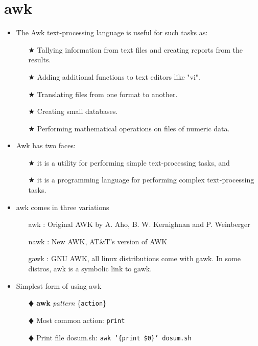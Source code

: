 \documentclass[10pt,t]{beamer}
\begin{document}
\section{awk}
\begin{frame}
  \begin{itemize}
    \item The Awk text-processing language is useful for such tasks as:
    \begin{enumerate}
      \item[$\bigstar$] Tallying information from text files and creating reports from the results.
      \item[$\bigstar$]Adding additional functions to text editors like "vi".
      \item[$\bigstar$] Translating files from one format to another.
      \item[$\bigstar$] Creating small databases.
      \item[$\bigstar$]Performing mathematical operations on files of numeric data.
    \end{enumerate}
    \item Awk has two faces: 
    \begin{enumerate}
      \item[$\bigstar$] it is a utility for performing simple text-processing tasks, and 
      \item[$\bigstar$] it is a programming language for performing complex text-processing tasks.
    \end{enumerate}
    \item awk comes in three variations
    \begin{enumerate}
        \item[awk]: Original AWK by A. Aho, B. W. Kernighnan and P. Weinberger
        \item[nawk]: New AWK, AT\&T's version of AWK
        \item[gawk]: GNU AWK, all linux distributions come with gawk. In some distros, awk is a symbolic link to gawk.
    \end{enumerate}
    \framebreak
    \item Simplest form of using awk
    \begin{enumerate}
      \item[$\vardiamond$]\textbf{awk} \textit{pattern} \{\texttt{action}\}
      \item[$\vardiamond$] Most common action: \texttt{print}
      \item[$\vardiamond$] Print file dosum.sh: \texttt{awk '\{print \$0\}' dosum.sh}

\end{enumerate}
\end{itemize}
\end{frame}
\end{document}
